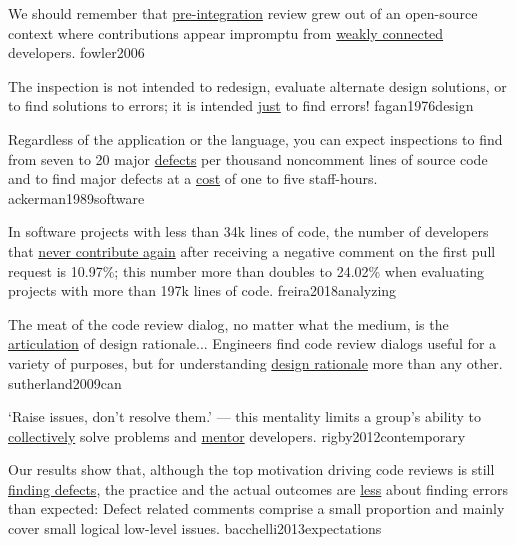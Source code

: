\documentclass{article}
\begin{document}

  {We should remember that \ul{pre-integration} review grew out of an open-source context where contributions appear impromptu from \ul{weakly connected} developers.}
  {fowler2006}


  {The inspection is not intended to redesign, evaluate alternate design solutions, or to find solutions to errors; it is intended \ul{just} to find errors!}
  {fagan1976design}

  {Regardless of the application or the language, you can expect inspections to find from seven to 20 major \ul{defects} per thousand noncomment lines of source code and to find major defects at a \ul{cost} of one to five staff-hours.}
  {ackerman1989software}

  {In software projects with less than 34k lines of code, the number of developers that \ul{never contribute again} after receiving a negative comment on the first pull request is 10.97\%; this number more than doubles to 24.02\% when evaluating projects with more than 197k lines of code.}
  {freira2018analyzing}


  {The meat of the code review dialog, no matter what the medium, is the \ul{articulation} of design rationale... Engineers find code review dialogs useful for a variety of purposes, but for understanding \ul{design rationale} more than any other.}
  {sutherland2009can}

  {`Raise issues, don't resolve them.' --- this mentality limits a group's ability to \ul{collectively} solve problems and \ul{mentor} developers.}
  {rigby2012contemporary}

  {Our results show that, although the top motivation driving code reviews is still \ul{finding defects}, the practice and the actual outcomes are \ul{less} about finding errors than expected: Defect related comments comprise a small proportion and mainly cover small logical low-level issues.}
  {bacchelli2013expectations}
\end{document}
